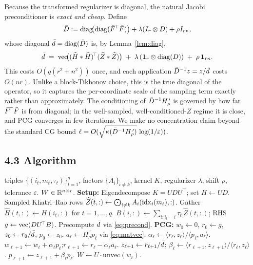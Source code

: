 \documentclass[11pt]{article}
\begin{document}
Because the transformed regularizer is diagonal, the natural Jacobi
preconditioner is \emph{exact and cheap}. Define
\[
  \bar D := \operatorname{diag}\!\bigl(\operatorname{diag}(\bar F^{\!\top}\bar F)\bigr)+\lambda(I_r\otimes D)+\rho I_{rn},
\]
whose diagonal $\bar d=\operatorname{diag}(\bar D)$ is, by Lemma~\ref{lem:diag},
\begin{equation}\label{eq:precond}
  \bar d \;=\; \operatorname{vec}\!\bigl((\widehat H\ast \widehat H)^{\!\top}(\widehat Z\ast \widehat Z)\bigr)
        \;+\;\lambda\,(\mathbf 1_r\otimes\operatorname{diag}(D))\;+\;\rho\,\mathbf 1_{rn}.
\end{equation}
This costs $O(q(r^2+n^2))$ once, and each application
$\bar D^{-1}z=z/\bar d$ costs $O(nr)$. Unlike a block-Tikhonov choice, this is the
true diagonal of the operator, so it captures the per-coordinate scale of the
sampling term exactly rather than approximately. The conditioning of
$\bar D^{-1}H_\rho^{\,\prime}$ is governed by how far $\bar F^{\!\top}\bar F$ is from
diagonal; in the well-sampled, well-conditioned-$Z$ regime it is close, and
PCG converges in few iterations. We make no concentration claim beyond the
standard CG bound $\ell=O(\sqrt{\kappa(\bar D^{-1}H_\rho^{\,\prime})}\,\log(1/\varepsilon))$.

\subsection*{4.3 Algorithm}

\begin{algorithm}[H]
\caption{PCG for the transformed RKHS mode-$k$ subproblem}
\begin{algorithmic}[1]
\Require triples $\{(i_t,m_t,\tau_t)\}_{t=1}^q$, factors $\{A_i\}_{i\ne k}$,
         kernel $K$, regularizer $\lambda$, shift $\rho$, tolerance $\varepsilon$.
\Ensure $W\in\mathbb{R}^{n\times r}$.
\State \textbf{Setup:}
\State \quad Eigendecompose $K=UDU^{\!\top}$;\; set $H\gets UD$. 
\State \quad Sampled Khatri--Rao rows $\widehat Z(t,:)\gets\bigodot_{i\ne k}A_i(\mathrm{idx}_i(m_t),:)$. 
\State \quad Gather $\widehat H(t,:)\gets H(i_t,:)$ for $t=1,\dots,q$. 
\State \quad $B(i,:)\gets\sum_{t:i_t=i}\tau_t\,\widehat Z(t,:)$;\; RHS $g\gets\operatorname{vec}(DU^{\!\top}B)$. 
\State \quad Precompute $\bar d$ via \eqref{eq:precond}. 
\State \textbf{PCG:} $w_0\gets0$, $r_0\gets g$, $z_0\gets r_0/\bar d$, $p_0\gets z_0$.
  \State $a_\ell\gets H_\rho^{\,\prime}p_\ell$ via \eqref{eq:matvec}. 
  \State $\alpha_\ell\gets\langle r_\ell,z_\ell\rangle/\langle p_\ell,a_\ell\rangle$.
  \State $w_{\ell+1}\gets w_\ell+\alpha_\ell p_\ell$;\quad $r_{\ell+1}\gets r_\ell-\alpha_\ell a_\ell$.
  \State $z_{\ell+1}\gets r_{\ell+1}/\bar d$;\quad
         $\beta_\ell\gets\langle r_{\ell+1},z_{\ell+1}\rangle/\langle r_\ell,z_\ell\rangle$.
  \State $p_{\ell+1}\gets z_{\ell+1}+\beta_\ell p_\ell$.
\EndFor
\State \Return $W\gets U\cdot\mathrm{unvec}(w_\ell)$. 
\end{algorithmic}
\end{algorithm}
\end{document}
